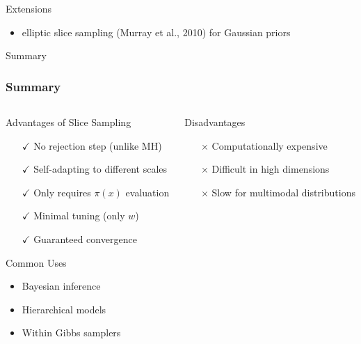 \documentclass[aspectratio=169]{beamer}
\begin{document}
\begin{frame}{Extensions}
	\begin{itemize}
		\item elliptic slice sampling (Murray et al., 2010) for Gaussian priors
	\end{itemize}
\end{frame}

\begin{frame}{Summary}
	\frametitle{Summary}

	\begin{columns}[T]
		\begin{column}{0.48\textwidth}
			\begin{block}{Advantages of Slice Sampling}
				\begin{itemize}
					\item[$\checkmark$] No rejection step (unlike MH)
					\item[$\checkmark$] Self-adapting to different scales
					\item[$\checkmark$] Only requires $\pi(x)$ evaluation
					\item[$\checkmark$] Minimal tuning (only $w$)
					\item[$\checkmark$] Guaranteed convergence
				\end{itemize}
			\end{block}

			\begin{block}{Common Uses}
				\begin{itemize}
					\item Bayesian inference
					\item Hierarchical models
					\item Within Gibbs samplers
				\end{itemize}
			\end{block}
		\end{column}
		\begin{column}{0.48\textwidth}
			\begin{block}{Disadvantages}
				\begin{itemize}
					\item[$\times$] Computationally expensive
					\item[$\times$] Difficult in high dimensions
					\item[$\times$] Slow for multimodal distributions
				\end{itemize}
			\end{block}


\end{column}
\end{columns}
\end{frame}
\end{document}
